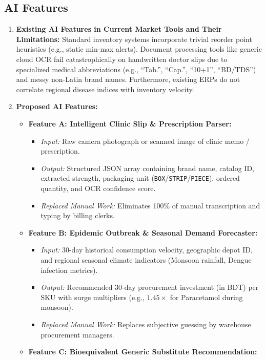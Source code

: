 \documentclass[12pt,a4paper]{article}
\begin{document}
\subsection{AI Features}
\begin{enumerate}
    \item \textbf{Existing AI Features in Current Market Tools and Their Limitations:} Standard inventory systems incorporate trivial reorder point heuristics (e.g., static min-max alerts). Document processing tools like generic cloud OCR fail catastrophically on handwritten doctor slips due to specialized medical abbreviations (e.g., ``Tab.'', ``Cap.'', ``10+1'', ``BD/TDS'') and messy non-Latin brand names. Furthermore, existing ERPs do not correlate regional disease indices with inventory velocity.
    \item \textbf{Proposed AI Features:}
    \begin{itemize}
        \item \textbf{Feature A: Intelligent Clinic Slip \& Prescription Parser:}
        \begin{itemize}
            \item \textit{Input:} Raw camera photograph or scanned image of clinic memo / prescription.
            \item \textit{Output:} Structured JSON array containing brand name, catalog ID, extracted strength, packaging unit (\texttt{BOX}/\texttt{STRIP}/\texttt{PIECE}), ordered quantity, and OCR confidence score.
            \item \textit{Replaced Manual Work:} Eliminates 100\% of manual transcription and typing by billing clerks.
        \end{itemize}
        \item \textbf{Feature B: Epidemic Outbreak \& Seasonal Demand Forecaster:}
        \begin{itemize}
            \item \textit{Input:} 30-day historical consumption velocity, geographic depot ID, and regional seasonal climate indicators (Monsoon rainfall, Dengue infection metrics).
            \item \textit{Output:} Recommended 30-day procurement investment (in BDT) per SKU with surge multipliers (e.g., $1.45\times$ for Paracetamol during monsoon).
            \item \textit{Replaced Manual Work:} Replaces subjective guessing by warehouse procurement managers.
        \end{itemize}
        \item \textbf{Feature C: Bioequivalent Generic Substitute Recommendation:}

\end{itemize}
\end{enumerate}
\end{document}

